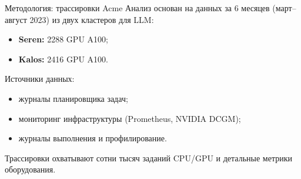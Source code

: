 \begin{frame}{Методология: трассировки Acme}
	Анализ основан на данных за 6 месяцев (март–август 2023) из двух кластеров для LLM:
	\begin{itemize}
		\item \textbf{Seren:} 2288 GPU A100;
		\item \textbf{Kalos:} 2416 GPU A100.
	\end{itemize}
	
	Источники данных:
	\begin{itemize}
		\item журналы планировщика задач;
		\item мониторинг инфраструктуры (Prometheus, NVIDIA DCGM);
		\item журналы выполнения и профилирование.
	\end{itemize}
	
	Трассировки охватывают сотни тысяч заданий CPU/GPU и детальные метрики оборудования.
\end{frame}